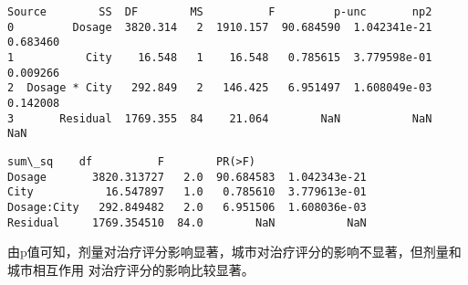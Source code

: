 \documentclass[11pt]{article}
\makeatletter
\newcommand{\boxspacing}{\kern\kvtcb@left@rule\kern\kvtcb@boxsep}
\newcommand{\prompt}[4]{
        \ttfamily\llap{{\color{#2}[#3]:\hspace{3pt}#4}}\vspace{-\baselineskip}
    }
\makeatother
\begin{document}
            \begin{tcolorbox}[breakable, size=fbox, boxrule=.5pt, pad at break*=1mm, opacityfill=0]
\prompt{Out}{outcolor}{13}{\boxspacing}
\begin{Verbatim}[commandchars=\\\{\}]
          Source        SS  DF        MS          F         p-unc       np2
0         Dosage  3820.314   2  1910.157  90.684590  1.042341e-21  0.683460
1           City    16.548   1    16.548   0.785615  3.779598e-01  0.009266
2  Dosage * City   292.849   2   146.425   6.951497  1.608049e-03  0.142008
3       Residual  1769.355  84    21.064        NaN           NaN       NaN
\end{Verbatim}
\end{tcolorbox}
        
    \begin{Verbatim}[commandchars=\\\{\}]
                  sum\_sq    df          F        PR(>F)
Dosage       3820.313727   2.0  90.684583  1.042343e-21
City           16.547897   1.0   0.785610  3.779613e-01
Dosage:City   292.849482   2.0   6.951506  1.608036e-03
Residual     1769.354510  84.0        NaN           NaN
    \end{Verbatim}

    由p值可知，剂量对治疗评分影响显著，城市对治疗评分的影响不显著，但剂量和城市相互作用
    对治疗评分的影响比较显著。


    
    
    
\end{document}

